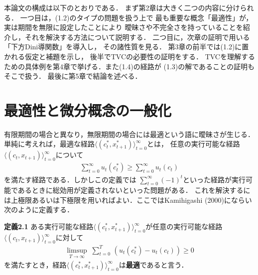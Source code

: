 \documentclass[a4paper,11pt]{jsarticle}
\begin{document}
本論文の構成は以下のとおりである．
まず第2章は大きく二つの内容に分けられる．
一つ目は，(1.2)のタイプの問題を扱う上で
最も重要な概念「最適性」が，実は期間を無限に設定したことにより
曖昧さや不完全さを持っていることを紹介し，それを解決する方法について説明する．
二つ目に，次章の証明で用いる「下方Dini導関数」を導入し，
その諸性質を見る．
第3章の前半では(1.2)に置かれる仮定と補題を示し，
後半でTVCの必要性の証明をする．
TVCを理解するための具体例を第4章で挙げる．また(1.4)の経路が
(1.3)の解であることの証明もそこで扱う．
最後に第5章で結論を述べる．

\vspace{7mm}

\section{最適性と微分概念の一般化}

有限期間の場合と異なり，無限期間の場合には最適という語に曖昧さが生じる．
単純に考えれば，最適な経路$\langle (c_t^*,x_{t+1}^*) \rangle_{t=0}^\infty$とは，
任意の実行可能な経路$\langle (c_t,x_{t+1}) \rangle_{t=0}^\infty$について
\begin{align}
	\sum_{t=0}^\infty u_t(c_t^*)\geq \sum_{t=0}^\infty u_t(c_t)
\end{align}
を満たす経路である．しかしこの定義では
${\textstyle \sum_{t=0}^\infty} (-1)^t$といった経路が実行可能であるときに総効用が定義されないといった問題がある．
これを解決するには上極限あるいは下極限を用いればよい．ここではKamihigashi (2000)にならい次のように定義する．

\vspace{7mm}
\noindent \textbf{定義2.1}\hspace*{.7mm} ある実行可能な経路$\langle (c_t^*,x_{t+1}^*) \rangle_{t=0}^\infty$が任意の実行可能な経路$\langle (c_t,x_{t+1}) \rangle_{t=0}^\infty$に対して
\begin{align}
	\limsup_{T\to \infty}\; \sum_{t=0}^T \, \left(u_t(c_t^*)-u_t(c_t) \right)\geq 0
\end{align}
を満たすとき，経路$\langle (c_t^*,x_{t+1}^*) \rangle_{t=0}^\infty$は\textbf{最適}であると言う．
\vspace{7mm}
\end{document}
